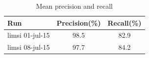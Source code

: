 \documentclass{acm_proc_article-me}
\begin{document}
\begin{table}[ht]
  \centering
  \begin{tabular}{|l|c|c|}
    \hline
	Run 				& Precision(\%)	& Recall(\%)		\\
	\hline
	\hline
	limsi 01-jul-15 	& 98.5			& 82.9			\\
	limsi 08-jul-15 	& 97.7			& 84.2			\\
  	\hline
  \end{tabular}
  \caption{Mean precision and recall}
  \label{tab:precions_and_recall}
\end{table}

%
%
%
%
%
%
%
\end{document}
